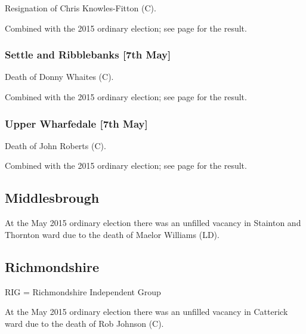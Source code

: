 \documentclass[a4paper,openany]{book}
\begin{document}
\begin{resultsiii}

Resignation of Chris Knowles-Fitton (C).

Combined with the 2015 ordinary election; see page \pageref{BardenFellCraven} for the result.

\subsubsection*{Settle and Ribblebanks \hspace*{\fill}\nolinebreak[1]%
\enspace\hspace*{\fill}
[7th May]}


Death of Donny Whaites (C).

Combined with the 2015 ordinary election; see page \pageref{SettleRibblebanksCraven} for the result.

\subsubsection*{Upper Wharfedale \hspace*{\fill}\nolinebreak[1]%
\enspace\hspace*{\fill}
[7th May]}


Death of John Roberts (C).

Combined with the 2015 ordinary election; see page \pageref{UpperWharfedaleCraven} for the result.

\subsection*{Middlesbrough}

At the May 2015 ordinary election there was an unfilled vacancy in Stainton and Thornton ward due to the death of Maelor Williams (LD).

\subsection*{Richmondshire}

RIG = Richmondshire Independent Group

At the May 2015 ordinary election there was an unfilled vacancy in Catterick ward due to the death of Rob Johnson (C).


\end{resultsiii}
\end{document}
